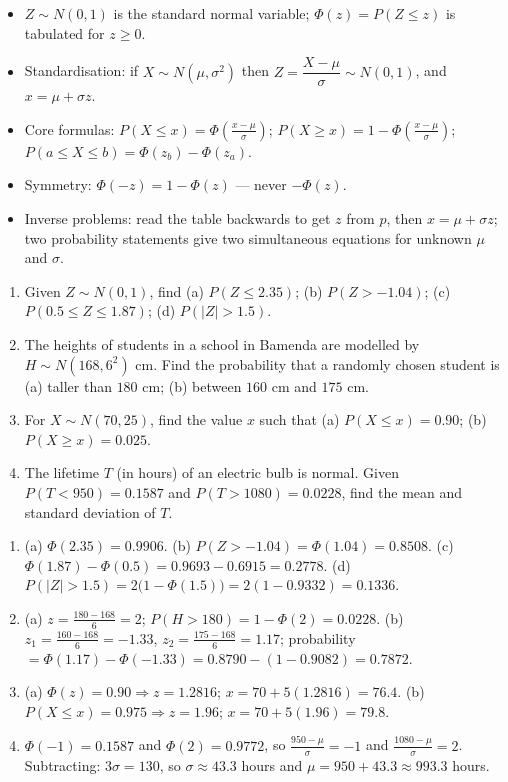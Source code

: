 \documentclass[11pt]{article}
\begin{document}
\begin{aretenir}
\begin{itemize}
\item $Z\sim N(0,1)$ is the standard normal variable; $\Phi(z)=P(Z\le z)$ is tabulated for $z\ge 0$.
\item Standardisation: if $X\sim N(\mu,\sigma^2)$ then $Z=\dfrac{X-\mu}{\sigma}\sim N(0,1)$, and $x=\mu+\sigma z$.
\item Core formulas: $P(X\le x)=\Phi\!\left(\frac{x-\mu}{\sigma}\right)$; $P(X\ge x)=1-\Phi\!\left(\frac{x-\mu}{\sigma}\right)$; $P(a\le X\le b)=\Phi(z_b)-\Phi(z_a)$.
\item Symmetry: $\Phi(-z)=1-\Phi(z)$ — never $-\Phi(z)$.
\item Inverse problems: read the table backwards to get $z$ from $p$, then $x=\mu+\sigma z$; two probability statements give two simultaneous equations for unknown $\mu$ and $\sigma$.
\end{itemize}
\end{aretenir}

\begin{exercice}[Practice]
\begin{enumerate}
\item Given $Z\sim N(0,1)$, find (a) $P(Z\le 2.35)$; (b) $P(Z>-1.04)$; (c) $P(0.5\le Z\le 1.87)$; (d) $P(|Z|>1.5)$.
\item The heights of students in a school in Bamenda are modelled by $H\sim N(168, 6^2)$ cm. Find the probability that a randomly chosen student is (a) taller than $180$ cm; (b) between $160$ cm and $175$ cm.
\item For $X\sim N(70, 25)$, find the value $x$ such that (a) $P(X\le x)=0.90$; (b) $P(X\ge x)=0.025$.
\item The lifetime $T$ (in hours) of an electric bulb is normal. Given $P(T<950)=0.1587$ and $P(T>1080)=0.0228$, find the mean and standard deviation of $T$.
\end{enumerate}
\end{exercice}

\begin{corrige}[Exercise 1]
\begin{enumerate}
\item (a) $\Phi(2.35)=0.9906$. (b) $P(Z>-1.04)=\Phi(1.04)=0.8508$. (c) $\Phi(1.87)-\Phi(0.5)=0.9693-0.6915=0.2778$. (d) $P(|Z|>1.5)=2\bigl(1-\Phi(1.5)\bigr)=2(1-0.9332)=0.1336$.
\item (a) $z=\frac{180-168}{6}=2$; $P(H>180)=1-\Phi(2)=0.0228$. (b) $z_1=\frac{160-168}{6}=-1.33$, $z_2=\frac{175-168}{6}=1.17$; probability $=\Phi(1.17)-\Phi(-1.33)=0.8790-(1-0.9082)=0.7872$.
\item (a) $\Phi(z)=0.90\Rightarrow z=1.2816$; $x=70+5(1.2816)=76.4$. (b) $P(X\le x)=0.975\Rightarrow z=1.96$; $x=70+5(1.96)=79.8$.
\item $\Phi(-1)=0.1587$ and $\Phi(2)=0.9772$, so $\frac{950-\mu}{\sigma}=-1$ and $\frac{1080-\mu}{\sigma}=2$. Subtracting: $3\sigma=130$, so $\sigma\approx 43.3$ hours and $\mu=950+43.3\approx 993.3$ hours.
\end{enumerate}
\end{corrige}
\end{document}
